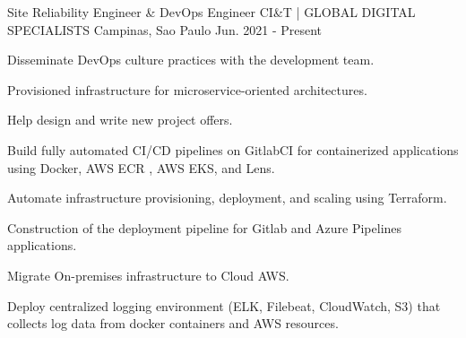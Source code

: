 

\begin{cventries}

  \cventry
    {Site Reliability Engineer \& DevOps Engineer} %
    {CI\&T | GLOBAL DIGITAL SPECIALISTS} %
    {Campinas, Sao Paulo} %
    {Jun. 2021 - Present} %
    {
      \begin{cvitems} %
        \item {Disseminate DevOps culture practices with the development team.}
        \item {Provisioned infrastructure for microservice-oriented architectures.}
        \item {Help design and write new project offers.}
        \item {Build fully automated CI/CD pipelines on GitlabCI for containerized applications using Docker, AWS ECR , AWS EKS, and Lens.}
        \item {Automate infrastructure provisioning, deployment, and scaling using Terraform.}
        \item {Construction of the deployment pipeline for Gitlab and Azure Pipelines applications.}
        \item {Migrate On-premises infrastructure to Cloud AWS.}
        \item {Deploy centralized logging environment (ELK, Filebeat, CloudWatch, S3) that collects log data from docker containers and AWS resources.}
      \end{cvitems}
    }
  \break


\end{cventries}
